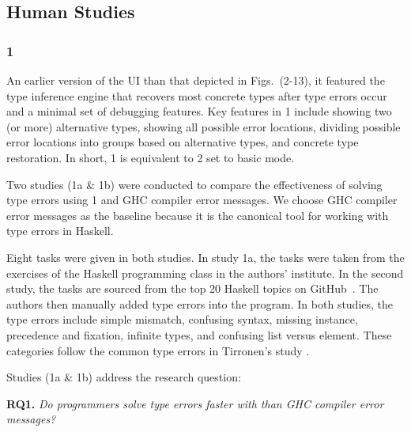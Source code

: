 \subsection{\chameleon{} Human Studies}

\subsubsection{\textbf{\chameleon{} 1}}  
An earlier version of the UI than that depicted in Figs.~(2-13), it featured the type inference engine that recovers most concrete types after type errors occur and a minimal set of debugging features. Key features in \chameleon{} 1 include showing two (or more) alternative types, showing all possible error locations, dividing possible error locations into groups based on alternative types, and concrete type restoration. In short, \chameleon{} 1 is equivalent to \chameleon{} 2 set to basic mode. 


Two  studies (1a \& 1b) were conducted to compare the effectiveness of solving type errors using \chameleon{} 1 and GHC compiler error messages. We choose GHC compiler error messages as the baseline because it is the canonical tool for working with type errors in Haskell.


Eight tasks were given in both studies. In study 1a, the tasks were taken from the exercises of the Haskell programming class in the authors' institute. In the second study, the tasks are sourced from the top 20 Haskell topics on GitHub~\cite{Github2022-nm}. The authors then manually added type errors into the program. In both studies, the type errors include simple mismatch, confusing syntax, missing instance, precedence and fixation, infinite types, and confusing list versus element. These categories follow the common type errors in Tirronen's study \cite{Tirronen2015-nr}. 

Studies (1a \& 1b) address the research question:

\noindent\textbf{RQ1.} \textit{Do programmers solve type errors faster with \chameleon{} than GHC compiler error messages?}


